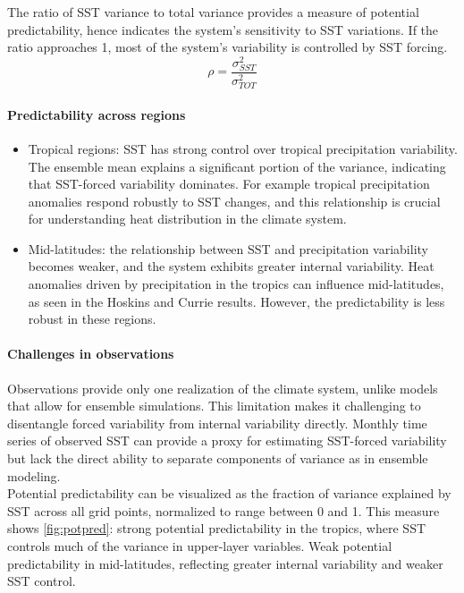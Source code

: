 The ratio of SST variance to total variance provides a measure of potential predictability, hence indicates the system's sensitivity to SST variations. If the ratio approaches 1, most of the system's variability is controlled by SST forcing.
\begin{equation}\label{eq.pot predictability}
	\rho=\frac{\sigma^2_{SST}}{\sigma^2_{TOT}}
\end{equation}

\paragraph{Predictability across regions}
\begin{itemize}
	\item Tropical regions: SST has strong control over tropical precipitation variability.
	      The ensemble mean explains a significant portion of the variance, indicating that SST-forced variability dominates. For example tropical precipitation anomalies respond robustly to SST changes, and this relationship is crucial for understanding heat distribution in the climate system.
	\item Mid-latitudes: the relationship between SST and precipitation variability becomes weaker, and the system exhibits greater internal variability.
	      Heat anomalies driven by precipitation in the tropics can influence mid-latitudes, as seen in the Hoskins and Currie results. However, the predictability is less robust in these regions.
\end{itemize}

\paragraph{Challenges in observations}
Observations provide only one realization of the climate system, unlike models that allow for ensemble simulations. This limitation makes it challenging to disentangle forced variability from internal variability directly. Monthly time series of observed SST can provide a proxy for estimating SST-forced variability but lack the direct ability to separate components of variance as in ensemble modeling.\\




Potential predictability can be visualized as the fraction of variance explained by SST across all grid points, normalized to range between 0 and 1. This measure shows \ref{fig:potpred}: strong potential predictability in the tropics, where SST controls much of the variance in upper-layer variables.
Weak potential predictability in mid-latitudes, reflecting greater internal variability and weaker SST control.


